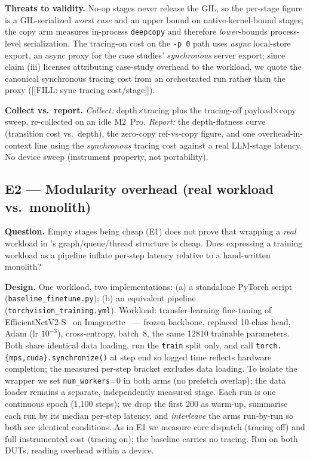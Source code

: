 \textbf{Threats to validity.} No-op stages never release the GIL, so the
per-stage figure is a GIL-serialized \emph{worst case} and an upper bound
on native-kernel-bound stages; the copy arm measures in-process
\texttt{deepcopy} and therefore \emph{lower}-bounds process-level
serialization. The tracing-on cost on the \texttt{-p 0} path uses
\emph{async} local-store export, an async proxy for the case studies'
\emph{synchronous} server export; since claim (iii) licenses attributing
case-study overhead to the workload, we quote the canonical synchronous
tracing cost from an orchestrated run rather than the proxy
([[FILL: sync tracing cost/stage]]).

\textbf{Collect vs.\ report.} \emph{Collect:} depth$\times$tracing plus the
tracing-off payload$\times$copy sweep, re-collected on an idle M2~Pro.
\emph{Report:} the depth-flatness curve (transition cost vs.\ depth), the
zero-copy ref-vs-copy figure, and one overhead-in-context line using the
\emph{synchronous} tracing cost against a real LLM-stage latency. No device
sweep (instrument property, not portability).

\subsection{E2 --- Modularity overhead (real workload vs.\ monolith)}
\label{sec:e2-modularity}

\textbf{Question.} Empty stages being cheap (E1) does not prove that
wrapping a \emph{real} workload in \sysname{}'s graph/queue/thread
structure is cheap. Does expressing a training workload as a \sysname{}
pipeline inflate per-step latency relative to a hand-written monolith?

\textbf{Design.} One workload, two implementations: (a) a standalone
PyTorch script (\texttt{baseline\_finetune.py}); (b) an equivalent
\sysname{} pipeline (\texttt{torchvision\_training.yml}). Workload:
transfer-learning fine-tuning of EfficientNetV2-S~\cite{tan2021efficientnetv2}
on Imagenette~\cite{imagenette} --- frozen backbone, replaced 10-class head,
Adam (lr $10^{-3}$), cross-entropy, batch~8, the same \num{12810}
trainable parameters. Both share identical data loading, run the
\texttt{train} split only, and call \texttt{torch.\{mps,cuda\}.synchronize()}
at step end so logged time reflects hardware completion; the measured
per-step bracket excludes data loading. To isolate the wrapper we set
\texttt{num\_workers}=0 in both arms (no prefetch overlap); the \sysname{}
data loader remains a separate, independently measured stage. Each run is
one continuous epoch (1{,}100 steps); we drop the first \num{200} as
warm-up, summarise each run by its median per-step latency, and
\emph{interleave} the arms run-by-run so both see identical conditions. As
in E1 we measure core dispatch (tracing off) and full instrumented cost
(tracing on); the baseline carries no tracing. Run on both DUTs, reading
overhead within a device.

